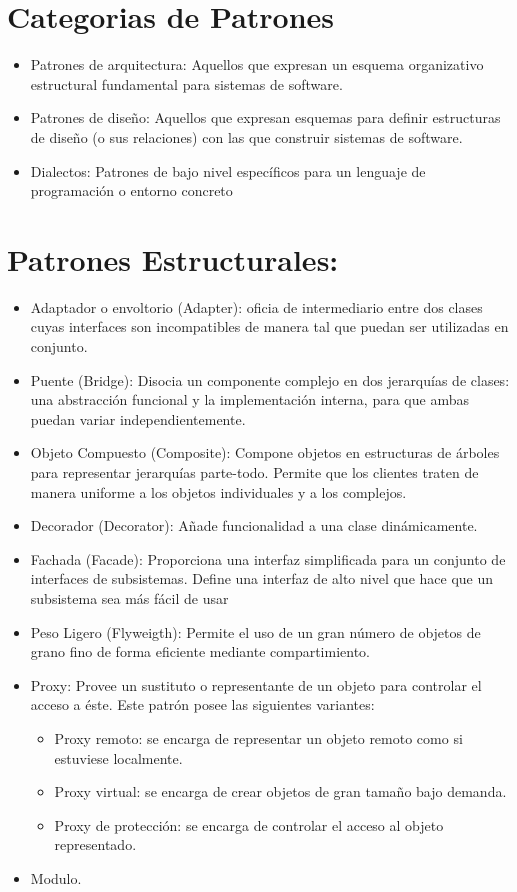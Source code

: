 \documentclass[10pt]{article}
\begin{document}
\section{Categorias de Patrones}
\begin{itemize}

\item Patrones de arquitectura: Aquellos que expresan un esquema organizativo estructural fundamental para 
sistemas de software.
\item Patrones de diseño: Aquellos que expresan esquemas para definir estructuras de diseño (o sus relaciones) 
con las que construir sistemas de software.
\item Dialectos: Patrones de bajo nivel específicos para un lenguaje de programación o entorno concreto
\end{itemize}

\newpage
\section{Patrones Estructurales:}
\begin{itemize}


\item Adaptador o envoltorio (Adapter): oficia de intermediario entre dos clases cuyas interfaces 
son incompatibles de manera tal que puedan ser utilizadas en 
conjunto. 
\item Puente (Bridge): Disocia un componente complejo en dos jerarquías de 
clases: una abstracción funcional y la implementación interna, para 
que ambas puedan variar independientemente.
\item Objeto Compuesto (Composite): Compone objetos en estructuras de árboles para 
representar jerarquías parte-todo. Permite que los clientes traten de 
manera uniforme a los objetos individuales y a los complejos. 
\item Decorador (Decorator): Añade funcionalidad a una clase dinámicamente.
\item Fachada (Facade): Proporciona una interfaz simplificada para un conjunto de 
interfaces de subsistemas. Define una interfaz de alto nivel que 
hace que un subsistema sea más fácil de usar
\item Peso Ligero (Flyweigth): Permite el uso de un gran número de objetos de grano 
fino de forma eficiente mediante compartimiento.
\item Proxy: Provee un sustituto o representante de un objeto para 
controlar el acceso a éste. Este patrón posee las siguientes variantes:
\begin{itemize} 
\item Proxy remoto: se encarga de representar un objeto remoto 
como si estuviese localmente. 
\item Proxy virtual: se encarga de crear objetos de gran tamaño bajo 
demanda. 
\item Proxy de protección: se encarga de controlar el acceso al objeto 
representado.
\end{itemize}

\item Modulo.

\end{itemize}
\end{document}
